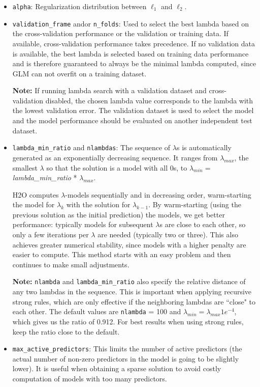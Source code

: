 \begin{itemize}
\item \texttt{alpha}: Regularization distribution between  $\ell_1$ and  $\ell_2$.
\item \texttt{validation\_frame} and\/or \texttt{n\_folds}: Used to select the best lambda based on the cross-validation performance  or the validation or training data. If available, cross-validation performance takes precedence. If no validation data is available, the best lambda is selected based on training data performance and is therefore guaranteed to always be the minimal lambda computed, since GLM can not overfit on a training dataset.
 
\textbf{Note:} If running lambda search with a validation dataset and cross-validation disabled, the chosen lambda value corresponds to the lambda with the lowest validation error. The validation dataset is used to select the model and the model performance should be evaluated on another independent test dataset. 

\item \texttt{lambda\_min\_ratio} and \texttt{nlambdas}: The sequence of $\lambda$s is automatically generated as an exponentially decreasing sequence. It ranges from $\lambda_{max}$,
the smallest $\lambda$ so that the solution is a model with all 0s, to $\lambda_{min} =
$ \textit{lambda\_min\_ratio} * $ \lambda_{max}$.

H2O computes $\lambda$-models sequentially and in decreasing order, warm-starting the model for $\lambda_k$ with the solution for $\lambda_{k-1}$. By warm-starting (using the previous solution as the initial prediction) the models, we get better performance: typically models for subsequent $\lambda$s are close to each other, so only a few iterations per $\lambda$ are needed (typically two or three). This also achieves greater numerical stability, since models with a higher penalty are easier to compute. This method starts with an easy problem and then continues to make small adjustments. 

\textbf{Note:} \texttt{nlambda} and \texttt{lambda\_min\_ratio} also specify the relative distance of any two
 lambdas in the sequence. This is important when applying recursive strong rules, which are only effective if the neighboring lambdas are ``close" to each other. The default values are \texttt{nlambda} = 100 and $\lambda_{min}
= \lambda_{max} 1e^{-4}$, which gives us the ratio of 0.912.  For best results when using strong rules, keep the
ratio close to the default.
\newpage
\item \texttt{max\_active\_predictors}: This limits the number of active predictors (the actual number of non-zero predictors in the model is going to be slightly lower). It is useful when obtaining a sparse solution to avoid costly computation of models with too many predictors.

\end{itemize}

